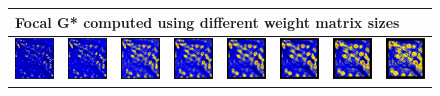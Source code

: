 \documentclass{itatnew}
\begin{document}
\begin{figure}[htp]
  \vspace{1em}
  \begin{tabular}{cccccccc}
    \multicolumn{8}{l}{Focal G* computed using different weight matrix sizes} \\
    \hline
    \includegraphics[width=4.6em]{images/gen-raw-blur-focalgstar-1}&
    \includegraphics[width=4.6em]{images/gen-raw-blur-focalgstar-2}&
    \includegraphics[width=4.6em]{images/gen-raw-blur-focalgstar-3}&
    \includegraphics[width=4.6em]{images/gen-raw-blur-focalgstar-4}&
    \includegraphics[width=4.6em]{images/gen-raw-blur-focalgstar-5}&
    \includegraphics[width=4.6em]{images/gen-raw-blur-focalgstar-6}&
    \includegraphics[width=4.6em]{images/gen-raw-blur-focalgstar-7}&
    \includegraphics[width=4.6em]{images/gen-raw-blur-focalgstar-8}\\
    

\end{tabular}
\end{figure}
\end{document}

